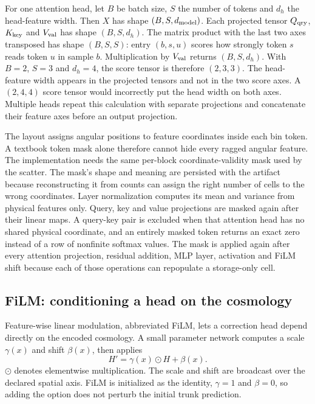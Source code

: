 \documentclass[10pt,aps,prd,twocolumn,nofootinbib]{revtex4-2}
\begin{document}
For one attention head, let $B$ be batch size, $S$ the number of tokens and
$d_h$ the head-feature width.  Then $X$ has shape $(B,S,d_{\rm model})$.
Each projected tensor $Q_{\rm qry}$, $K_{\rm key}$ and $V_{\rm val}$ has
shape $(B,S,d_h)$.  The matrix product with the last two axes transposed has
shape $(B,S,S)$: entry $(b,s,u)$ scores how strongly token $s$ reads token
$u$ in sample $b$.  Multiplication by $V_{\rm val}$ returns
$(B,S,d_h)$.  With $B=2$, $S=3$ and $d_h=4$, the score tensor is therefore
$(2,3,3)$.  The head-feature width appears in the projected tensors and not
in the two score axes.  A $(2,4,4)$ score tensor would incorrectly put the
head width on both axes.  Multiple heads repeat this calculation with
separate projections and concatenate their feature axes before an output
projection.

The layout assigns angular positions to feature coordinates inside each bin
token.  A textbook token mask alone
therefore cannot hide every ragged angular feature.  The implementation needs
the same per-block coordinate-validity mask used by the scatter.  The mask's
shape and meaning are persisted with the artifact because reconstructing it
from counts can assign the right number of cells to the wrong coordinates.
Layer normalization computes its mean and variance from physical features
only.  Query, key and value projections are masked again after their linear
maps.  A query-key pair is excluded when that attention head has no shared
physical coordinate, and an entirely masked token returns an exact zero
instead of a row of nonfinite softmax values.  The mask is applied again after
every attention projection, residual addition, MLP layer, activation and FiLM
shift because each of those operations can repopulate a storage-only cell.

\subsection{FiLM: conditioning a head on the cosmology}

Feature-wise linear modulation, abbreviated FiLM, lets a correction head
depend directly on the encoded cosmology.  A small parameter network computes
a scale $\gamma(x)$ and shift $\beta(x)$, then applies
\begin{equation*}
  H'=\gamma(x)\odot H+\beta(x).
\end{equation*}
$\odot$ denotes elementwise multiplication.  The scale and shift are
broadcast over the declared spatial axis.  FiLM is initialized as the
identity, $\gamma=1$ and $\beta=0$, so adding the option does not perturb the
initial trunk prediction.
\end{document}
